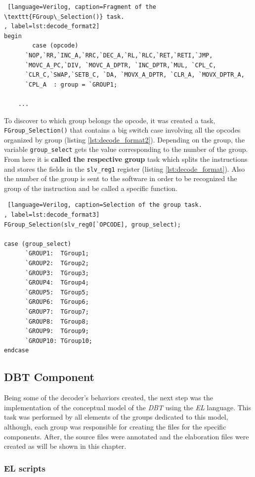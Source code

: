 \documentclass[12pt]{article}
\begin{document}
{\begin{lstlisting} [language=Verilog, caption=Fragment of the \texttt{FGroup\_Selection()} task.
, label=lst:decode_format2]
begin
		case (opcode)
      `NOP,`RR,`INC_A,`RRC,`DEC_A,`RL,`RLC,`RET,`RETI,`JMP, 
      `MOVC_A_PC,`DIV, `MOVC_A_DPTR, `INC_DPTR,`MUL, `CPL_C,
      `CLR_C,`SWAP,`SETB_C, `DA, `MOVX_A_DPTR, `CLR_A, `MOVX_DPTR_A,
      `CPL_A  : group = `GROUP1;
      
	...
\end{lstlisting}

To discover to which group belongs the opcode, it was created a task, \texttt{FGroup\_Selection()} that contains a big switch case involving all the opcodes organized by group (listing \ref{lst:decode_format2}). Depending on the group, the variable \texttt{group\_select} gets the value corresponding to the number of the group. From here it is \textbf{called the respective group} task which splits the instructions and stores the fields in the \texttt{slv\_reg1} register (listing \ref{lst:decode_format}). Also the number of the group is sent to the software in order to be recognized the group of the instruction and be called a specific function.



\begin{lstlisting} [language=Verilog, caption=Selection of the group task.
, label=lst:decode_format3]
FGroup_Selection(slv_reg0[`OPCODE], group_select);        
           
case (group_select)
      `GROUP1:  TGroup1;
      `GROUP2:  TGroup2;
      `GROUP3:  TGroup3;
      `GROUP4:  TGroup4;
      `GROUP5:  TGroup5;
      `GROUP6:  TGroup6;
      `GROUP7:  TGroup7;
      `GROUP8:  TGroup8;
      `GROUP9:  TGroup9;
      `GROUP10: TGroup10;          
endcase
\end{lstlisting}




\subsection {DBT Component}
Being some of the decoder's behaviors created, the next step was the implementation of the conceptual model of the \textit{DBT} using the \textit{EL} language. This task was performed by all elements of the groups dedicated to this model, although, each group was responsible for creating the files for the specific components. After, the source files were  annotated and the elaboration files were created as will be shown in this chapter.

\subsubsection{EL scripts}

}
\end{document}
